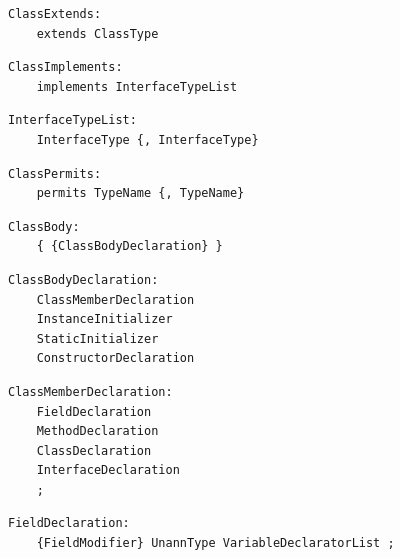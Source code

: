 \noindent\textbf{\texttt{}}\par
\begin{lstlisting}
ClassExtends:
    extends ClassType
\end{lstlisting}

\noindent\textbf{\texttt{}}\par
\begin{lstlisting}
ClassImplements:
    implements InterfaceTypeList
\end{lstlisting}

\noindent\textbf{\texttt{}}\par
\begin{lstlisting}
InterfaceTypeList:
    InterfaceType {, InterfaceType}
\end{lstlisting}

\noindent\textbf{\texttt{}}\par
\begin{lstlisting}
ClassPermits:
    permits TypeName {, TypeName}
\end{lstlisting}

\noindent\textbf{\texttt{}}\par
\begin{lstlisting}
ClassBody:
    { {ClassBodyDeclaration} }
\end{lstlisting}

\noindent\textbf{\texttt{}}\par
\begin{lstlisting}
ClassBodyDeclaration:
    ClassMemberDeclaration
    InstanceInitializer
    StaticInitializer
    ConstructorDeclaration
\end{lstlisting}

\noindent\textbf{\texttt{}}\par
\begin{lstlisting}
ClassMemberDeclaration:
    FieldDeclaration
    MethodDeclaration
    ClassDeclaration
    InterfaceDeclaration
    ;
\end{lstlisting}

\noindent\textbf{\texttt{}}\par
\begin{lstlisting}
FieldDeclaration:
    {FieldModifier} UnannType VariableDeclaratorList ;
\end{lstlisting}

